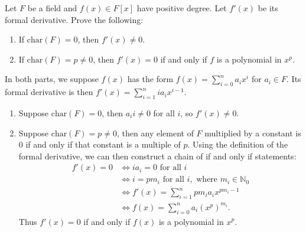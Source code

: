 \documentclass[10pt]{report}
\begin{document}
\begin{exer}[A]
	Let $F$ be a field and $f(x) \in F[x]$ have positive degree. Let $f'(x)$ be its formal derivative. Prove the following:
	\begin{enumerate}
		\item If $\text{char}(F)=0$, then $f'(x)\neq 0$.
		\item If $\text{char}(F)=p\neq 0$, then $f'(x)=0$ if and only if $f$ is a polynomial in $x^p$.
	\end{enumerate}
\end{exer}
In both parts, we suppose $f(x)$ has the form $f(x)= \sum_{i=0}^{n} a_i x^i$ for $a_i \in F$. Its formal derivative is then $f'(x) = \sum_{i=1}^{n} i a_i x^{i-1}$.
\begin{enumerate}
	\item Suppose $\text{char}(F)=0$, then $a_i i \neq 0$ for all $i$, so $f'(x)\neq 0$.

	\item Suppose $\text{char}(F)=p\neq 0$, then any element of $F$ multiplied by a constant is 0 if and only if that constant is a multiple of $p$. Using the definition of the formal derivative, we can then construct a chain of if and only if statements:
		\begin{align*}
			f'(x) = 0 &\iff i a_i = 0 \text{ for all } i \\
				  &\iff i = p m_i \text{ for all } i, \text{ where } m_i \in \mathbb{N}_{0} \\
				  &\iff f'(x) = \sum_{i=1}^{n} pm_i a_i x^{pm_i - 1}\\
				  &\iff f(x) = \sum_{i=0}^{n} a_i (x^{p})^{m_i}.
		\end{align*}
		Thus $f'(x)=0$ if and only if $f(x)$ is a polynomial in $x^{p}$.
\end{enumerate}
\end{document}
